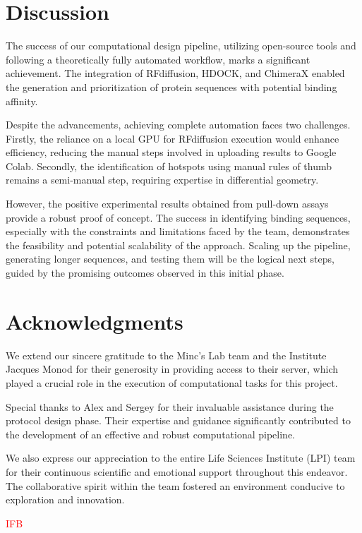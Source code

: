 \documentclass[11pt,a4paper]{article}
\begin{document}
\section{Discussion}

The success of our computational design pipeline, utilizing open-source tools and following a theoretically fully automated workflow, marks a significant achievement. The integration of RFdiffusion, HDOCK, and ChimeraX enabled the generation and prioritization of protein sequences with potential binding affinity.

Despite the advancements, achieving complete automation faces two challenges. Firstly, the reliance on a local GPU for RFdiffusion execution would enhance efficiency, reducing the manual steps involved in uploading results to Google Colab. Secondly, the identification of hotspots using manual rules of thumb remains a semi-manual step, requiring expertise in differential geometry.

However, the positive experimental results obtained from pull-down assays provide a robust proof of concept. The success in identifying binding sequences, especially with the constraints and limitations faced by the team, demonstrates the feasibility and potential scalability of the approach. Scaling up the pipeline, generating longer sequences, and testing them will be the logical next steps, guided by the promising outcomes observed in this initial phase.

\section*{Acknowledgments}

We extend our sincere gratitude to the Minc's Lab team and the Institute Jacques Monod for their generosity in providing access to their server, which played a crucial role in the execution of computational tasks for this project.

Special thanks to Alex and Sergey for their invaluable assistance during the protocol design phase. Their expertise and guidance significantly contributed to the development of an effective and robust computational pipeline.

We also express our appreciation to the entire Life Sciences Institute (LPI) team for their continuous scientific and emotional support throughout this endeavor. The collaborative spirit within the team fostered an environment conducive to exploration and innovation.

\textcolor{red}{IFB}

\printbibliography
\end{document}
